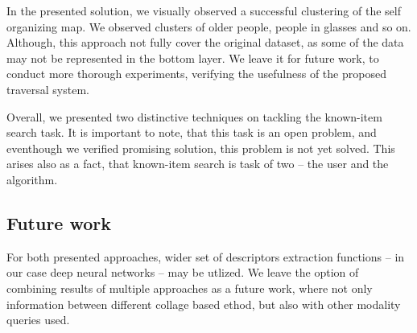 In the presented solution, we visually observed a successful clustering of the self organizing map. We observed clusters of older people, people in glasses and so on. Although, this approach not fully cover the original dataset, as some of the data may not be represented in the bottom layer. We leave it for future work, to conduct more thorough experiments, verifying the usefulness of the proposed traversal system.

\vspace{1em}

Overall, we presented two distinctive techniques on tackling the known-item search task. It is important to note, that this task is an open problem, and eventhough we verified promising solution, this problem is not yet solved. This arises also as a fact, that known-item search is task of two -- the user and the algorithm.

\subsection*{Future work}

For both presented approaches, wider set of descriptors extraction functions -- in our case deep neural networks -- may be utlized. We leave the option of combining results of multiple approaches as a future work, where not only information between different collage based ethod, but also with other modality queries used.